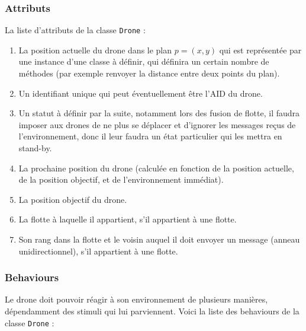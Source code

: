 \documentclass[11pt]{report}
\begin{document}
\subsubsection{Attributs}

La liste d'attributs de la classe \verb|Drone| :

\begin{enumerate}
\item La position actuelle du drone dans le plan $p = (x, y)$ qui est représentée par une instance d'une classe à définir, qui définira un certain nombre de méthodes (par exemple renvoyer la distance entre deux points du plan).

\item Un identifiant unique qui peut éventuellement être l'AID du drone.

\item Un statut à définir par la suite, notamment lors des fusion de flotte, il faudra imposer aux drones de ne plus se déplacer et d'ignorer les messages reçus de l'environnement, donc il leur faudra un état particulier qui les mettra en stand-by.

\item La prochaine position du drone (calculée en fonction de la position actuelle, de la position objectif, et de l'environnement immédiat).

\item La position objectif du drone.

\item La flotte à laquelle il appartient, s'il appartient à une flotte.

\item Son rang dans la flotte et le voisin auquel il doit envoyer un message (anneau unidirectionnel), s'il appartient à une flotte.
\end{enumerate}

\subsubsection{Behaviours} 

Le drone doit pouvoir réagir à son environnement de plusieurs manières, dépendamment des stimuli qui lui parviennent. Voici la liste des behaviours de la classe \verb|Drone| :
\end{document}
